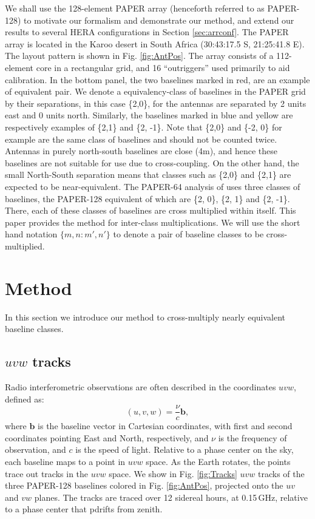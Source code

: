 \documentclass[twocolumn,apj,numberedappendix]{emulateapj}
\renewcommand\[{\begin{equation}}
\renewcommand\]{\end{equation}}
\begin{document}
We shall use the 128-element PAPER array (henceforth referred to as PAPER-128) to motivate our formalism and demonstrate our method, and extend our results to several HERA configurations in Section \ref{sec:arrconf}. 
The PAPER array is located in the Karoo desert in South Africa (30:43:17.5
S, 21:25:41.8 E). The layout pattern is shown
in Fig. \ref{fig:AntPos}. The array consists of a 112-element core in a rectangular grid, and 16 ``outriggers'' used primarily to aid calibration.  In the bottom panel, the two baselines marked in red, are an example of equivalent pair. We denote a equivalency-class of baselines in the PAPER grid by their separations, in this case  \{2,0\}, for the
antennas are separated by 2 units east and 0 units north. Similarly,
the baselines marked in blue and yellow are respectively examples
of \{2,1\} and \{2, -1\}.
Note that \{2,0\} and \{-2, 0\} for example are the same class of baselines and should not be counted twice. Antennas in purely north-south baselines
are close (4m), and hence these baselines are not suitable
for use due to cross-coupling. On the other hand, the small North-South separation means that classes such as \{2,0\} and  \{2,1\} are expected to be near-equivalent. The PAPER-64 analysis of \cite{Ali2015} uses three classes of baselines, the PAPER-128
equivalent of which are 
\{2, 0\}, \{2, 1\} and \{2, -1\}. There, each of these classes
of baselines are cross multiplied within itself. This paper provides the method for inter-class multiplications. We will use the short hand notation $\{m,n:m',n'\}$ to denote a pair of baseline classes to be cross-multiplied. 


\section{Method \label{sec:method}}\label{sec:method}

In this section we introduce our method to cross-multiply nearly equivalent baseline classes. 

\subsection{$uvw$ tracks \label{sec:tracks}}


Radio interferometric observations are often described in the coordinates $uvw$, defined as:
\[
(u, v, w) = \frac{\nu}{c}\boldsymbol{b}, 
\]
where $\boldsymbol{b}$ is the baseline vector in Cartesian coordinates, with first and second coordinates pointing East and North, respectively, and  $\nu$ is the frequency of observation, and $c$ is the speed of light. 
Relative to a phase center on the sky, each baseline maps to a point in $uvw$ space. As the Earth rotates, the points trace out tracks in the $uvw$ space. 
We show in Fig. \ref{fig:Tracks} $uvw$ tracks of the three PAPER-128 baselines colored in Fig. \ref{fig:AntPos}, projected onto the $uv$ and $vw$ planes. The tracks are traced over 12 sidereal hours, at 0.15\,GHz, relative to a phase center that pdrifts from zenith. 
\end{document}
